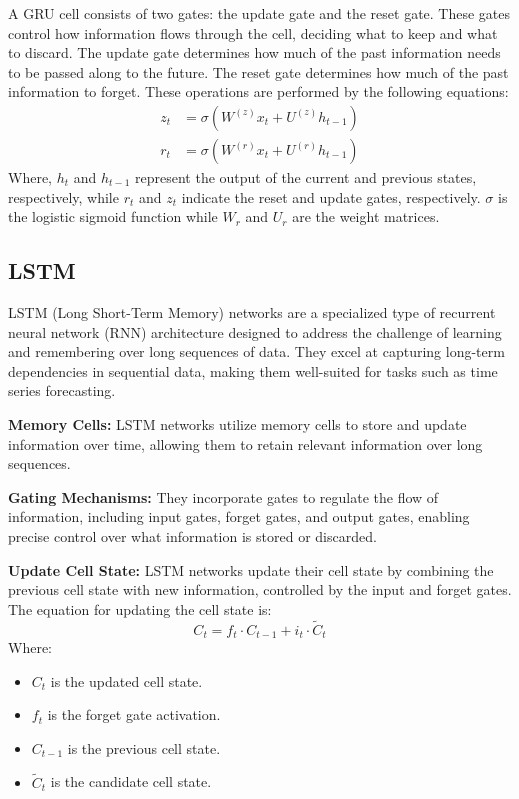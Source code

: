 \documentclass{ieeeojies}
\begin{document}
A GRU cell consists of two gates: the update gate and the reset gate. These gates control how information flows through the cell, deciding what to keep and what to discard. The update gate determines how much of the past information needs to be passed along to the future. The reset gate determines how much of the past information to forget. These operations are performed by the following equations:
\begin{align*}
z_t &= \sigma\left( W^{(z)} x_t + U^{(z)} h_{t-1} \right) \\
r_t &= \sigma\left( W^{(r)} x_t + U^{(r)} h_{t-1} \right)
\end{align*}
Where, \(h_t\) and \(h_{t-1}\) represent the output of the current and previous states, respectively, while \(r_t\) and \(z_t\) indicate the reset and update gates, respectively. \(\sigma\) is the logistic sigmoid function while \(W_r\) and \(U_r\) are the weight matrices.


\subsection{LSTM} 
LSTM (Long Short-Term Memory) networks are a specialized type of recurrent neural network (RNN) architecture designed to address the challenge of learning and remembering over long sequences of data. They excel at capturing long-term dependencies in sequential data, making them well-suited for tasks such as time series forecasting.\par
\noindent

\textbf{Memory Cells:} LSTM networks utilize memory cells to store and update information over time, allowing them to retain relevant information over long sequences.
  
\textbf{Gating Mechanisms:} They incorporate gates to regulate the flow of information, including input gates, forget gates, and output gates, enabling precise control over what information is stored or discarded.

\textbf{Update Cell State:} LSTM networks update their cell state by combining the previous cell state with new information, controlled by the input and forget gates. The equation for updating the cell state is:
\begin{equation*}
  C_t = f_t \cdot C_{t-1} + i_t \cdot \tilde{C}_t
\end{equation*}
Where:
        \begin{itemize}
            \item \( C_t \) is the updated cell state.
            \item \( f_t \) is the forget gate activation.
            \item \( C_{t-1} \) is the previous cell state.
            \item \( \tilde{C}_t \) is the candidate cell state.
        \end{itemize}
\end{document}
